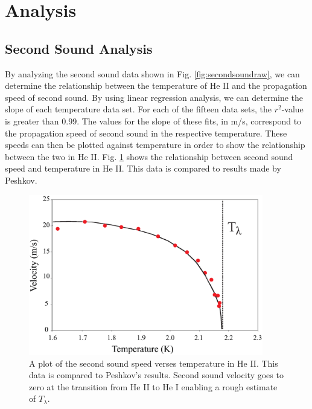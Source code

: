 
\section{Analysis}\label{analysis}
\subsection{Second Sound Analysis}\label{secondsoundanalysis}

By analyzing the second sound data shown in Fig. \ref{fig:secondsoundraw}, we can determine the relationship between the temperature of He II and the propagation speed of second sound.  By using linear regression analysis, we can determine the slope of each temperature data set.  For each of the fifteen data sets, the $r^{2}$-value is greater than $0.99$.  The values for the slope of these fits, in m/s, correspond to the propagation speed of second sound in the respective temperature.  These speeds can then be plotted against temperature in order to show the relationship between the two in He II.  Fig. \ref{fig:secondsound} shows the relationship between second sound speed and temperature in He II.  This data is compared to results made by Peshkov.\cite{peshkov}

\begin{figure}[htbp]
\begin{center}
\includegraphics[height=70mm]{./figures/secondsound.eps}
\caption{\small{A plot of the second sound speed verses temperature in He II.  This data is compared to Peshkov's results.\cite{peshkov} Second sound velocity goes to zero at the transition from He II to He I enabling a rough estimate of $T_{\lambda}$.}}
\label{fig:secondsound}
\end{center}
\end{figure}

